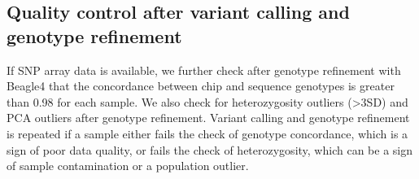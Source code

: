 \subsection{Quality control after variant calling and genotype refinement}
If SNP array data is available, we further check after genotype refinement with Beagle4 that the concordance between chip and sequence genotypes is greater than 0.98 for each sample. We also check for heterozygosity outliers (\textgreater3SD) and PCA outliers after genotype refinement. Variant calling and genotype refinement is repeated if a sample either fails the check of genotype concordance, which is a sign of poor data quality, or fails the check of heterozygosity, which can be a sign of sample contamination or a population outlier.